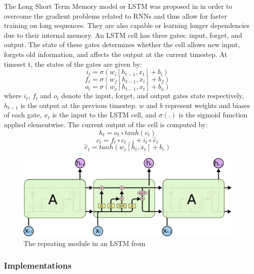 The Long Short Term Memory model or LSTM was proposed in \cite{LSTMs} in order to overcome the gradient problems related to RNNs and thus allow for faster training on long sequences.
They are also capable or learning longer dependencies due to their internal memory. An LSTM cell has three gates: input, forget, and output.
The state of these gates determines whether the cell allows new input, forgets old information, and affects the output at the current timestep.
At timeset t, the states of the gates are given by:
\begin{equation}
    i_t=\sigma(w_i[h_{t-1},x_t]+b_i)
\end{equation}
\begin{equation}
    f_t=\sigma(w_f[h_{t-1},x_t]+b_f)
\end{equation}
\begin{equation}
    o_t=\sigma(w_o[h_{t-1},x_t]+b_o)
\end{equation}
where $i_t$, $f_t$ and $o_t$ denote the input, forget, and output gates state respectively, $h_{t-1}$ is the output at the previous timestep.
$w$ and $b$ represent weights and biases of each gate, $x_t$ is the input to the LSTM cell, and $\sigma (.)$ is the sigmoid function applied elementwise.
The current output of the cell is computed by:
\begin{equation}
    h_t=o_t \circ tanh(c_t)
\end{equation}
\begin{equation}
    c_t = f_t \circ c_{t-1}+i_t \circ \overset{\sim}{c}_t
\end{equation}
\begin{equation}
    \overset{\sim}{c}_t = tanh(w_c[h_t,x_t]+b_c)
\end{equation}

\begin{figure}
    \centering
    \includegraphics[width=0.8\columnwidth]{Figures/LSTM}
    \decoRule
    \caption{The repeating module in an LSTM from \cite{oinkina}}
    \label{fig:LSTM}
\end{figure}

\subsubsection{Implementations}

